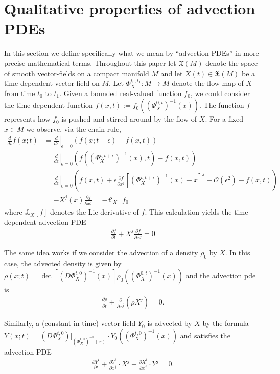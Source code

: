 \documentclass[12pt]{amsart}
\newcommand{\pder}[2]{\ensuremath{\frac{ \partial #1}{\partial #2}}}
\begin{document}
\section{Qualitative properties of advection PDEs}
\label{sec:properties}
In this section we define specifically what we mean by ``advection PDEs'' in more precise mathematical terms.
Throughout this paper let $\mathfrak{X}(M)$ denote the space of smooth vector-fields on a compact manifold $M$
and let $X(t) \in \mathfrak{X}(M)$ be a time-dependent vector-field on $M$.
Let $\Phi^{t_{0},t_{1}}_{X}:M\to M$ denote the flow map of $X$ from time $t_{0}$ to $t_{1}$.
Given a bounded real-valued function $f_{0}$, we could consider the time-dependent function $f(x,t) := f_{0} ( (\Phi_{X}^{0,t})^{-1}(x) )$.
The function $f$ represents how $f_{0}$ is pushed and stirred around by the flow of $X$.
For a fixed $x \in M$ we observe, via the chain-rule,
\begin{align*}
	 \frac{d}{dt}  f(x;t) &=  \left. \frac{d}{d \epsilon} \right|_{\epsilon=0} ( f(x;t+\epsilon) - f(x,t) ) \\
	 &=  \left. \frac{d}{d \epsilon} \right|_{\epsilon=0} \left( f( (\Phi_{X}^{t,t+\epsilon})^{-1}(x) , t ) - f(x,t) \right) \\
	 &=  \left. \frac{d}{d \epsilon} \right|_{\epsilon=0} \left( f(x,t) + \epsilon \pder{f}{x^{j}} [ (\Phi_{X}^{t,t+\epsilon})^{-1}(x) - x ]^{j} + \mathcal{O}(\epsilon^{2}) - f(x,t) \right) \\
	 &= - X^{j}(x) \pder{f}{x^{j}} = - \pounds_{X}[f_{0}]
\end{align*}
where $\pounds_{X}[f]$ denotes the Lie-derivative of $f$.
This calculation yields the time-dependent advection PDE
\begin{align}\label{eq:function pde}
	\pder{f}{t} + X^{j} \pder{f}{x^{j}} = 0
\end{align}

The same idea works if we consider the advection of a density $\rho_{0}$ by $X$.
In this case, the advected density is given by $\rho (x ; t) =  \det\left[ (D\Phi_{X}^{t,0})^{-1} (x) \right] \rho_{0}( (\Phi_{X}^{0,t})^{-1}(x) )$
and the advection pde is
\begin{align} \label{eq:density pde}
	\pder{\rho}{t} + \pder{}{x^{j}} \left( \rho X^{j} \right) = 0.
\end{align}

Similarly, a (constant in time) vector-field $Y_{0}$ is advected by $X$ by the formula $Y(x ; t) =  (D\Phi_{X}^{t,0})|_{(\Phi_{X}^{t,0})^{-1}(x)} \cdot Y_{0}( (\Phi_{X}^{t,0})^{-1}(x))$
and satisfies the advection PDE
\begin{align} \label{eq:vector field pde}
	\pder{Y^{i}}{t} + \pder{Y^{i}}{x^{j}} \cdot X^{j} - \pder{X^{i}}{x^{j}} \cdot Y^{j} = 0.
\end{align}
\end{document}
